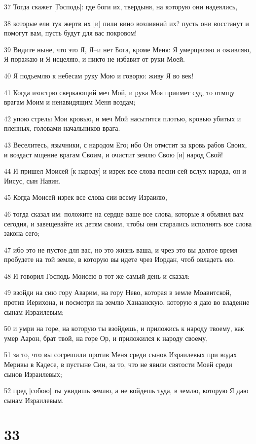 \par 37 Тогда скажет [Господь]: где боги их, твердыня, на которую они надеялись,
\par 38 которые ели тук жертв их [и] пили вино возлияний их? пусть они восстанут и помогут вам, пусть будут для вас покровом!
\par 39 Видите ныне, что это Я, Я--и нет Бога, кроме Меня: Я умерщвляю и оживляю, Я поражаю и Я исцеляю, и никто не избавит от руки Моей.
\par 40 Я подъемлю к небесам руку Мою и говорю: живу Я во век!
\par 41 Когда изострю сверкающий меч Мой, и рука Моя приимет суд, то отмщу врагам Моим и ненавидящим Меня воздам;
\par 42 упою стрелы Мои кровью, и меч Мой насытится плотью, кровью убитых и пленных, головами начальников врага.
\par 43 Веселитесь, язычники, с народом Его; ибо Он отмстит за кровь рабов Своих, и воздаст мщение врагам Своим, и очистит землю Свою [и] народ Свой!
\par 44 И пришел Моисей [к народу] и изрек все слова песни сей вслух народа, он и Иисус, сын Навин.
\par 45 Когда Моисей изрек все слова сии всему Израилю,
\par 46 тогда сказал им: положите на сердце ваше все слова, которые я объявил вам сегодня, и завещевайте их детям своим, чтобы они старались исполнять все слова закона сего;
\par 47 ибо это не пустое для вас, но это жизнь ваша, и чрез это вы долгое время пробудете на той земле, в которую вы идете чрез Иордан, чтоб овладеть ею.
\par 48 И говорил Господь Моисею в тот же самый день и сказал:
\par 49 взойди на сию гору Аварим, на гору Нево, которая в земле Моавитской, против Иерихона, и посмотри на землю Ханаанскую, которую я даю во владение сынам Израилевым;
\par 50 и умри на горе, на которую ты взойдешь, и приложись к народу твоему, как умер Аарон, брат твой, на горе Ор, и приложился к народу своему,
\par 51 за то, что вы согрешили против Меня среди сынов Израилевых при водах Меривы в Кадесе, в пустыне Син, за то, что не явили святости Моей среди сынов Израилевых;
\par 52 пред [собою] ты увидишь землю, а не войдешь туда, в землю, которую Я даю сынам Израилевым.

\chapter{33}

